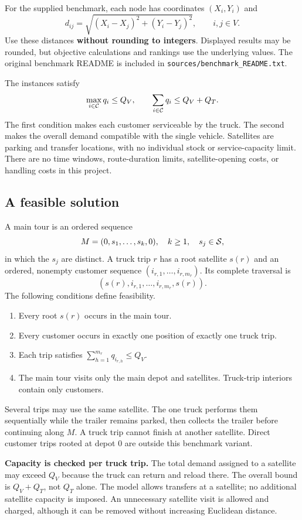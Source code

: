 \documentclass[11pt,a4paper]{article}
\newcommand{\code}[1]{{\small\texttt{#1}}}
\begin{document}
For the supplied benchmark, each node has coordinates $(X_i,Y_i)$ and
\[
 d_{ij}=\sqrt{(X_i-X_j)^2+(Y_i-Y_j)^2},\qquad i,j\in V.
\]
Use these distances \textbf{without rounding to integers}. Displayed results may be rounded, but objective calculations and rankings use the underlying values. The original benchmark README is included in \code{sources/\allowbreak{}benchmark\_\allowbreak{}README.txt}.

The instances satisfy
\[
\max_{i\in\mathcal C} q_i\le Q_V,\qquad \sum_{i\in\mathcal C}q_i\le Q_V+Q_T.
\]
The first condition makes each customer serviceable by the truck. The second makes the overall demand compatible with the single vehicle. Satellites are parking and transfer locations, with no individual stock or service-capacity limit. There are no time windows, route-duration limits, satellite-opening costs, or handling costs in this project.

\subsection{A feasible solution}
A main tour is an ordered sequence
\[
M=(0,s_1,\ldots,s_k,0),\quad k\ge1,\quad s_j\in\mathcal S,
\]
in which the $s_j$ are distinct. A truck trip $r$ has a root satellite $s(r)$ and an ordered, nonempty customer sequence $(i_{r,1},\ldots,i_{r,m_r})$. Its complete traversal is
\[
(s(r),i_{r,1},\ldots,i_{r,m_r},s(r)).
\]
The following conditions define feasibility.
\begin{enumerate}
\item Every root $s(r)$ occurs in the main tour.
\item Every customer occurs in exactly one position of exactly one truck trip.
\item Each trip satisfies $\sum_{h=1}^{m_r}q_{i_{r,h}}\le Q_V$.
\item The main tour visits only the main depot and satellites. Truck-trip interiors contain only customers.
\end{enumerate}
Several trips may use the same satellite. The one truck performs them sequentially while the trailer remains parked, then collects the trailer before continuing along $M$. A truck trip cannot finish at another satellite. Direct customer trips rooted at depot 0 are outside this benchmark variant.

\textbf{Capacity is checked per truck trip.} The total demand assigned to a satellite may exceed $Q_V$ because the truck can return and reload there. The overall bound is $Q_V+Q_T$, not $Q_T$ alone. The model allows transfers at a satellite; no additional satellite capacity is imposed. An unnecessary satellite visit is allowed and charged, although it can be removed without increasing Euclidean distance.
\end{document}

